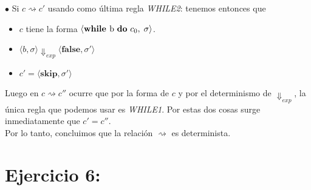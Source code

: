 \documentclass[11pt, fleqn]{article}
\begin{document}

$\bullet$ Si $ c \rightsquigarrow c' $ usando como última regla \emph{WHILE2}: tenemos entonces que
\begin{itemize}
      \item $c$ tiene la forma $ \langle \textbf{while } \text{b \textbf{do} } c_0, \; \sigma \rangle$.
      \item $ \langle b, \sigma \rangle \Downarrow_{exp} \langle \textbf{false}, \sigma' \rangle$
      \item $c' = \langle \textbf{skip}, \sigma' \rangle$
\end{itemize}

Luego en $ c \rightsquigarrow c'' $ ocurre que por la forma de $c$ y por el determinismo
de $\Downarrow_{exp}$, la única regla que podemos usar es \emph{WHILE1}. Por estas dos cosas
surge inmediatamente que $c' = c''$. \\

Por lo tanto, concluimos que la relación $ \rightsquigarrow $ es determinista.


\section*{Ejercicio 6:}
\end{document}
